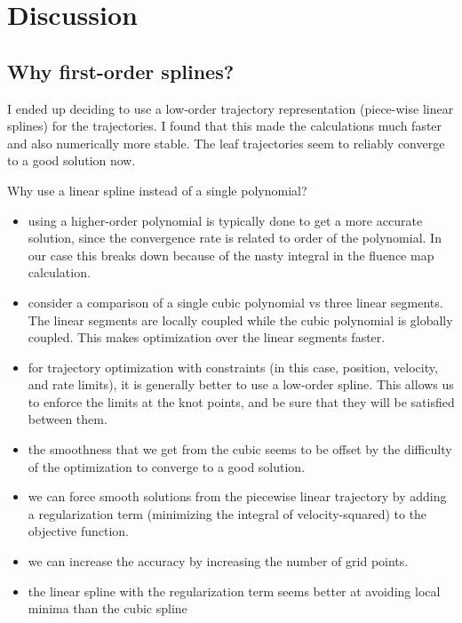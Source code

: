 \section{Discussion}

\subsection{Why first-order splines?}

I ended up deciding to use a low-order trajectory representation (piece-wise linear splines) for the trajectories.
I found that this made the calculations much faster and also numerically more stable.
The leaf trajectories seem to reliably converge to a good solution now.

Why use a linear spline instead of a single polynomial?
\begin{itemize}
  \item using a higher-order polynomial is typically done to get a more accurate solution,
      since the convergence rate is related to order of the polynomial. In our case this breaks down because of the nasty integral in the fluence map calculation.
  \item consider a comparison of a single cubic polynomial vs three linear segments.
      The linear segments are locally coupled while the cubic polynomial is globally coupled.
      This makes optimization over the linear segments faster.
  \item for trajectory optimization with constraints (in this case, position, velocity, and rate limits),
      it is generally better to use a low-order spline.
      This allows us to enforce the limits at the knot points, and be sure that they will be satisfied between them.
  \item the smoothness that we get from the cubic seems to be offset by the difficulty of the
      optimization to converge to a good solution.
  \item we can force smooth solutions from the piecewise linear trajectory by adding a
      regularization term (minimizing the integral of velocity-squared) to the objective function.
  \item we can increase the accuracy by increasing the number of grid points.
  \item the linear spline with the regularization term seems better at avoiding local minima than the cubic spline
\end{itemize}

